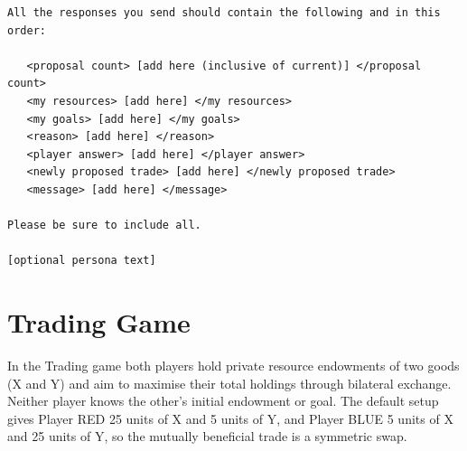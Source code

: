\begin{lstlisting}[caption={Buy-Sell game system prompt (player-specific fields in brackets).},label={lst:buysell-prompt}]
All the responses you send should contain the following and in this order:

   <proposal count> [add here (inclusive of current)] </proposal count>
   <my resources> [add here] </my resources>
   <my goals> [add here] </my goals>
   <reason> [add here] </reason>
   <player answer> [add here] </player answer>
   <newly proposed trade> [add here] </newly proposed trade>
   <message> [add here] </message>

Please be sure to include all.

[optional persona text]
\end{lstlisting}


\section{Trading Game}
\label{ap2:trading}

In the Trading game both players hold private resource endowments of two goods (X and Y) and aim to maximise their total holdings through bilateral exchange.
Neither player knows the other's initial endowment or goal.
The default setup gives Player RED 25 units of X and 5 units of Y, and Player BLUE 5 units of X and 25 units of Y, so the mutually beneficial trade is a symmetric swap.

